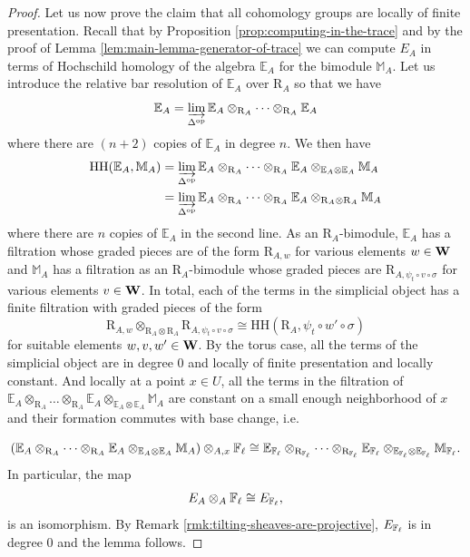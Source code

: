 \documentclass[a4paper, 10pt, oneside, reqno]{amsart}
\theoremstyle{plain}
\theoremstyle{definition}
\theoremstyle{remark}
\newcommand{\RR}{\mathrm{R}}
\newcommand{\opp}{\mathrm{op}}
\newcommand{\HHH}{\mathrm{HH}}
\newcommand{\EE}{\mathbb{E}}
\newcommand{\Mbb}{\mathbb{M}}
\begin{document}
\begin{proof}
Let us now prove the claim that all cohomology groups are locally of finite presentation. Recall that by Proposition \ref{prop:computing-in-the-trace} and by the proof of Lemma \ref{lem:main-lemma-generator-of-trace} we can compute $E_{A}$ in terms of Hochschild homology of the algebra $\EE_{A}$ for the bimodule $\Mbb_{A}$. 
Let us introduce the relative bar resolution of $\EE_A$ over $\RR_A$ so that we have 
$$\EE_A = \varinjlim_{\Delta^{\opp}} \EE_A \otimes_{\RR_A} \dots \otimes_{\RR_A} \EE_A$$
where there are $(n+2)$ copies of $\EE_A$ in degree $n$. We then have 
\begin{align*}
\HHH(\EE_A, \Mbb_A) &= \varinjlim_{\Delta^{\opp}} \EE_A \otimes_{\RR_A} \dots \otimes_{\RR_A} \EE_A  \otimes_{\EE_A \otimes \EE_A} \Mbb_A  \\
&= \varinjlim_{\Delta^{\opp}} \EE_A \otimes_{\RR_A} \dots \otimes_{\RR_A} \EE_A  \otimes_{\RR_A \otimes \RR_A} \Mbb_A
\end{align*}
where there are $n$ copies of $\EE_A$ in the second line. As an $\RR_A$-bimodule, $\EE_A$ has a filtration whose graded pieces are of the form $\RR_{A,w}$ for various elements $w \in \mathbf{W}$ and $\Mbb_A$ has a filtration as an $\RR_A$-bimodule whose graded pieces are $\RR_{A, \psi_t \circ v \circ \sigma}$ for various elements $v \in \mathbf{W}$. In total, each of the terms in the simplicial object has a finite filtration with graded pieces of the form 
$$\RR_{A,w} \otimes_{\RR_{A} \otimes \RR_{A}} \RR_{A, \psi_t \circ v \circ \sigma} \cong \HHH(\RR_{A}, \psi_t \circ w' \circ \sigma)$$
for suitable elements $w,v,w' \in \mathbf{W}$. By the torus case, all the terms of the simplicial object are in degree $0$ and locally of finite presentation and locally constant. And locally at a point $x \in U$, all the terms in the filtration of $\EE_A \otimes_{\RR_A} \dots \otimes_{\RR_A} \EE_A  \otimes_{\EE_A \otimes \EE_A} \Mbb_A$ are constant on a small enough neighborhood of $x$ and their formation commutes with base change, i.e.

$$(\EE_A \otimes_{\RR_A} \dots \otimes_{\RR_A} \EE_A  \otimes_{\EE_A \otimes \EE_A} \Mbb_A) \otimes_{A, x} \Fl \cong \EE_{\Fl} \otimes_{\RR_{\Fl}} \dots \otimes_{\RR_{\Fl}} \EE_{\Fl} \otimes_{\EE_{\Fl} \otimes \EE_{\Fl}} \Mbb_{\Fl}.$$
In particular, the map 
$$E_{A} \otimes_{A} \mathbb{F}_{\ell} \cong E_{\mathbb{F}_{\ell}},$$
is an isomorphism. By Remark \ref{rmk:tilting-sheaves-are-projective}, $E_{\mathbb{F}_{\ell}}$ is in degree $0$ and the lemma follows. 

\end{proof}
\end{document}
